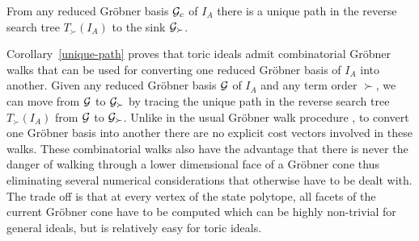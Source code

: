 \documentclass[11pt]{article}
\begin{document}
\begin{corollary}\label{unique-path}
From any reduced Gr\"obner basis ${\cal G}_c$ of $I_A$ there is a 
unique path in the reverse search tree $T_\succ(I_A)$ to the sink 
${\cal G}_\succ$.  
\end{corollary}

Corollary~\ref{unique-path} proves that toric ideals admit
combinatorial Gr\"obner walks that can be used for converting one
reduced Gr\"obner basis of $I_A$ into another. Given any reduced
Gr\"obner basis ${\cal G}$ of $I_A$ and any term order $\succ$, we can
move from ${\cal G}$ to ${\cal G}_\succ$ by tracing the unique path in the 
reverse search tree $T_\succ(I_A)$ from ${\cal G}$ to ${\cal G}_\succ$. 
Unlike in the usual Gr\"obner walk procedure \cite{CKM},\cite{AGK} 
to convert one Gr\"obner basis into another there are no explicit cost
vectors involved in these walks. These combinatorial walks also have
the advantage that there is never the danger of walking through a
lower dimensional face of a Gr\"obner cone thus eliminating several
numerical considerations that otherwise have to be dealt with. The
trade off is that at every vertex of the state polytope, all facets of
the current Gr\"obner cone have to be computed which can be highly
non-trivial for general ideals, but is relatively easy for toric ideals.
\end{document}
